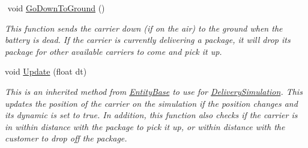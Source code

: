 \begin{DoxyCompactItemize}
$$\mbox{\label{classcsci3081_1_1Carrier_ab09ba1ba2a316e0ef29458cc9c303afd}} 
void \hyperlink{classcsci3081_1_1Carrier_ab09ba1ba2a316e0ef29458cc9c303afd}{Go\+Down\+To\+Ground} ()
\begin{DoxyCompactList}\small\item\em This function sends the carrier down (if on the air) to the ground when the battery is dead. If the carrier is currently delivering a package, it will drop its package for other available carriers to come and pick it up. \end{DoxyCompactList}\item 
\mbox{\label{classcsci3081_1_1Carrier_a5f202411aa049586514a48129b959ed7}} 
void \hyperlink{classcsci3081_1_1Carrier_a5f202411aa049586514a48129b959ed7}{Update} (float dt)
\begin{DoxyCompactList}\small\item\em This is an inherited method from \hyperlink{classcsci3081_1_1EntityBase}{Entity\+Base} to use for \hyperlink{classcsci3081_1_1DeliverySimulation}{Delivery\+Simulation}. This updates the position of the carrier on the simulation if the position changes and its dynamic is set to true. In addition, this function also checks if the carrier is in within distance with the package to pick it up, or within distance with the customer to drop off the package. \end{DoxyCompactList}\end{DoxyCompactItemize}
